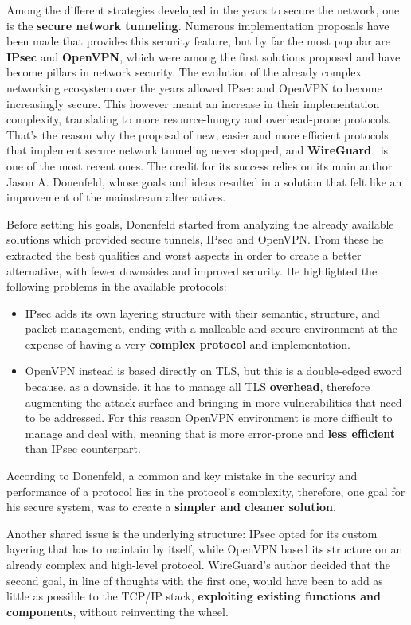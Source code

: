 \documentclass[light]{academica}
\begin{document}
Among the different strategies developed in the years to secure the network, one is the \textbf{secure network tunneling}.
Numerous implementation proposals have been made that provides this security feature, but by far the most popular are \textbf{IPsec} and \textbf{OpenVPN}, which were among the first solutions proposed and have become pillars in network security.
The evolution of the already complex networking ecosystem over the years allowed IPsec and OpenVPN to become increasingly secure.
This however meant an increase in their implementation complexity, translating to more resource-hungry and overhead-prone protocols.
That's the reason why the proposal of new, easier and more efficient protocols that implement secure network tunneling never stopped, and \textbf{WireGuard}~\cite{whitepaper} is one of the most recent ones.
The credit for its success relies on its main author Jason A. Donenfeld, whose goals and ideas resulted in a solution that felt like an improvement of the mainstream alternatives.

Before setting his goals, Donenfeld started from analyzing the already available solutions which provided secure tunnels, \ie IPsec and OpenVPN.
From these he extracted the best qualities and worst aspects in order to create a better alternative, with fewer downsides and improved security.
He highlighted the following problems in the available protocols:
\begin{itemize}
  \item IPsec adds its own layering structure with their semantic, structure, and packet management, ending with a malleable and secure environment at the expense of having a very \textbf{complex protocol} and implementation.
  \item OpenVPN instead is based directly on TLS, but this is a double-edged sword because, as a downside, it has to manage all TLS \textbf{overhead}, therefore augmenting the attack surface and bringing in more vulnerabilities that need to be addressed. For this reason OpenVPN environment is more difficult to manage and deal with, meaning that is more error-prone and \textbf{less efficient} than IPsec counterpart.
\end{itemize}

According to Donenfeld, a common and key mistake in the security and performance of a protocol lies in the protocol's complexity, therefore, one goal for his secure system, was to create a \textbf{simpler and cleaner solution}.

Another shared issue is the underlying structure: IPsec opted for its custom layering that has to maintain by itself, while OpenVPN based its structure on an already complex and high-level protocol.
WireGuard's author decided that the second goal, in line of thoughts with the first one, would have been to add as little as possible to the TCP/IP stack, \textbf{exploiting existing functions and components}, without reinventing the wheel.
\end{document}
